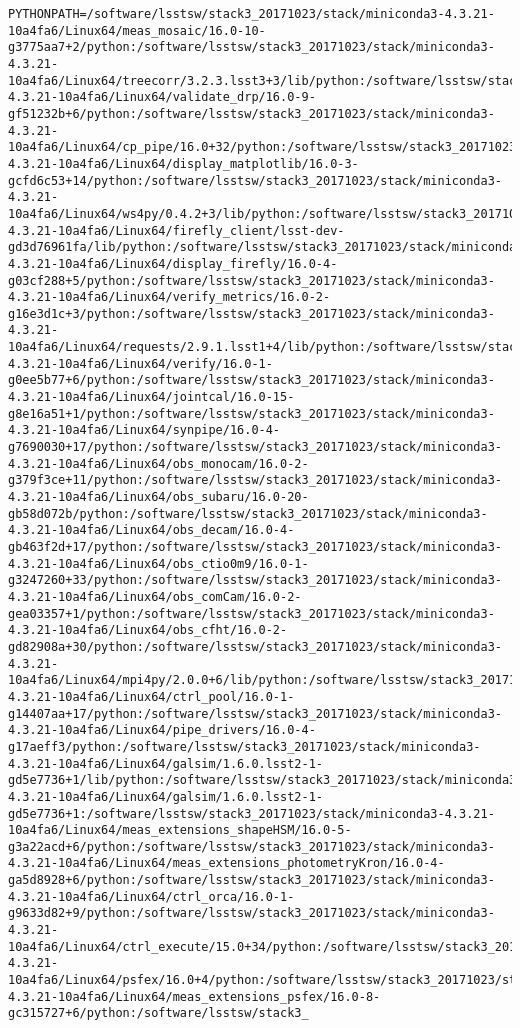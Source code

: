 \begin{verbatim}
PYTHONPATH=/software/lsstsw/stack3_20171023/stack/miniconda3-4.3.21-10a4fa6/Linux64/meas_mosaic/16.0-10-g3775aa7+2/python:/software/lsstsw/stack3_20171023/stack/miniconda3-4.3.21-10a4fa6/Linux64/treecorr/3.2.3.lsst3+3/lib/python:/software/lsstsw/stack3_20171023/stack/miniconda3-4.3.21-10a4fa6/Linux64/validate_drp/16.0-9-gf51232b+6/python:/software/lsstsw/stack3_20171023/stack/miniconda3-4.3.21-10a4fa6/Linux64/cp_pipe/16.0+32/python:/software/lsstsw/stack3_20171023/stack/miniconda3-4.3.21-10a4fa6/Linux64/display_matplotlib/16.0-3-gcfd6c53+14/python:/software/lsstsw/stack3_20171023/stack/miniconda3-4.3.21-10a4fa6/Linux64/ws4py/0.4.2+3/lib/python:/software/lsstsw/stack3_20171023/stack/miniconda3-4.3.21-10a4fa6/Linux64/firefly_client/lsst-dev-gd3d76961fa/lib/python:/software/lsstsw/stack3_20171023/stack/miniconda3-4.3.21-10a4fa6/Linux64/display_firefly/16.0-4-g03cf288+5/python:/software/lsstsw/stack3_20171023/stack/miniconda3-4.3.21-10a4fa6/Linux64/verify_metrics/16.0-2-g16e3d1c+3/python:/software/lsstsw/stack3_20171023/stack/miniconda3-4.3.21-10a4fa6/Linux64/requests/2.9.1.lsst1+4/lib/python:/software/lsstsw/stack3_20171023/stack/miniconda3-4.3.21-10a4fa6/Linux64/verify/16.0-1-g0ee5b77+6/python:/software/lsstsw/stack3_20171023/stack/miniconda3-4.3.21-10a4fa6/Linux64/jointcal/16.0-15-g8e16a51+1/python:/software/lsstsw/stack3_20171023/stack/miniconda3-4.3.21-10a4fa6/Linux64/synpipe/16.0-4-g7690030+17/python:/software/lsstsw/stack3_20171023/stack/miniconda3-4.3.21-10a4fa6/Linux64/obs_monocam/16.0-2-g379f3ce+11/python:/software/lsstsw/stack3_20171023/stack/miniconda3-4.3.21-10a4fa6/Linux64/obs_subaru/16.0-20-gb58d072b/python:/software/lsstsw/stack3_20171023/stack/miniconda3-4.3.21-10a4fa6/Linux64/obs_decam/16.0-4-gb463f2d+17/python:/software/lsstsw/stack3_20171023/stack/miniconda3-4.3.21-10a4fa6/Linux64/obs_ctio0m9/16.0-1-g3247260+33/python:/software/lsstsw/stack3_20171023/stack/miniconda3-4.3.21-10a4fa6/Linux64/obs_comCam/16.0-2-gea03357+1/python:/software/lsstsw/stack3_20171023/stack/miniconda3-4.3.21-10a4fa6/Linux64/obs_cfht/16.0-2-gd82908a+30/python:/software/lsstsw/stack3_20171023/stack/miniconda3-4.3.21-10a4fa6/Linux64/mpi4py/2.0.0+6/lib/python:/software/lsstsw/stack3_20171023/stack/miniconda3-4.3.21-10a4fa6/Linux64/ctrl_pool/16.0-1-g14407aa+17/python:/software/lsstsw/stack3_20171023/stack/miniconda3-4.3.21-10a4fa6/Linux64/pipe_drivers/16.0-4-g17aeff3/python:/software/lsstsw/stack3_20171023/stack/miniconda3-4.3.21-10a4fa6/Linux64/galsim/1.6.0.lsst2-1-gd5e7736+1/lib/python:/software/lsstsw/stack3_20171023/stack/miniconda3-4.3.21-10a4fa6/Linux64/galsim/1.6.0.lsst2-1-gd5e7736+1:/software/lsstsw/stack3_20171023/stack/miniconda3-4.3.21-10a4fa6/Linux64/meas_extensions_shapeHSM/16.0-5-g3a22acd+6/python:/software/lsstsw/stack3_20171023/stack/miniconda3-4.3.21-10a4fa6/Linux64/meas_extensions_photometryKron/16.0-4-ga5d8928+6/python:/software/lsstsw/stack3_20171023/stack/miniconda3-4.3.21-10a4fa6/Linux64/ctrl_orca/16.0-1-g9633d82+9/python:/software/lsstsw/stack3_20171023/stack/miniconda3-4.3.21-10a4fa6/Linux64/ctrl_execute/15.0+34/python:/software/lsstsw/stack3_20171023/stack/miniconda3-4.3.21-10a4fa6/Linux64/psfex/16.0+4/python:/software/lsstsw/stack3_20171023/stack/miniconda3-4.3.21-10a4fa6/Linux64/meas_extensions_psfex/16.0-8-gc315727+6/python:/software/lsstsw/stack3_
\end{verbatim}
